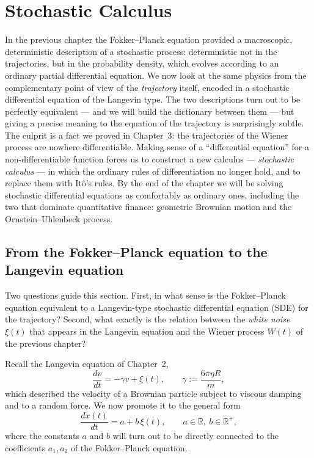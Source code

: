 
\chapter{Stochastic Calculus}

In the previous chapter the Fokker--Planck equation provided a macroscopic, deterministic description of a stochastic process: deterministic not in the trajectories, but in the probability density, which evolves according to an ordinary partial differential equation.
We now look at the same physics from the complementary point of view of the \emph{trajectory} itself, encoded in a stochastic differential equation of the Langevin type.
The two descriptions turn out to be perfectly equivalent --- and we will build the dictionary between them --- but giving a precise meaning to the equation of the trajectory is surprisingly subtle.
The culprit is a fact we proved in Chapter~3: the trajectories of the Wiener process are nowhere differentiable.
Making sense of a ``differential equation'' for a non-differentiable function forces us to construct a new calculus --- \emph{stochastic calculus} --- in which the ordinary rules of differentiation no longer hold, and to replace them with It\^o's rules.
By the end of the chapter we will be solving stochastic differential equations as comfortably as ordinary ones, including the two that dominate quantitative finance: geometric Brownian motion and the Ornstein--Uhlenbeck process.


\section[From the Fokker--Planck equation to the Langevin equation]
{From the Fokker--Planck equation to the\\Langevin equation}

Two questions guide this section.
First, in what sense is the Fokker--Planck equation equivalent to a Langevin-type stochastic differential equation (SDE) for the trajectory?
Second, what exactly is the relation between the \emph{white noise} $\xi(t)$ that appears in the Langevin equation and the Wiener process $W(t)$ of the previous chapter?

Recall the Langevin equation of Chapter~2,
\begin{equation}
\frac{dv}{dt} = -\gamma v + \xi(t),\qquad \gamma := \frac{6\pi\eta R}{m},
\end{equation}
which described the velocity of a Brownian particle subject to viscous damping and to a random force.
We now promote it to the general form
\begin{equation}
\frac{dx(t)}{dt} = a + b\,\xi(t),\qquad a\in\mathbb{R},\ b\in\mathbb{R}^+,
\end{equation}
where the constants $a$ and $b$ will turn out to be directly connected to the coefficients $a_1,a_2$ of the Fokker--Planck equation.

